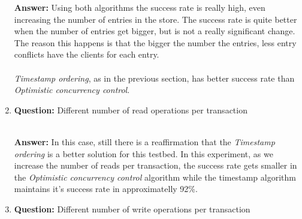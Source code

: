 \documentclass[a4paper, 10pt]{article}
\begin{document}
\begin{enumerate}
\textbf{Answer:} Using both algorithms the success rate is really high, even
increasing the number of entries in the store. The success rate is quite better
when the number of entries get bigger, but is not a really significant change.
The reason this happens is that the bigger the number the entries, less entry
conflicts have the clients for each entry.\\\\

\textit{Timestamp ordering}, as in the previous section, has better success rate than \textit{Optimistic concurrency control}.

\item \textbf{Question:} Different number of read operations per transaction\\\\
  
\begin{minipage}[H]{\linewidth}
  \centering
  \label{fig:timey_graph_entries}
\end{minipage}

\textbf{Answer:} In this case, still there is a reaffirmation that the \textit{Timestamp ordering} is a better solution for this testbed. In this experiment, as we increase the number of reads per transaction, the success rate gets smaller in the \textit{Optimistic concurrency control} algorithm while the timestamp algorithm maintains it's success rate in approximatelly 92\%.


\item \textbf{Question:} Different number of write operations per transaction\\\\


\end{enumerate}
\end{document}
